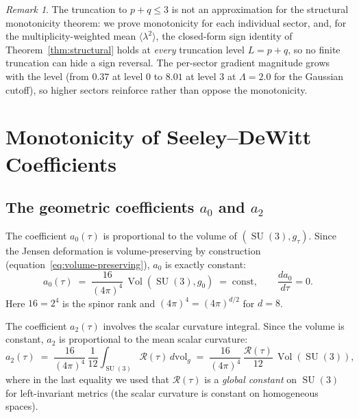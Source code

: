 \documentclass[12pt]{article}
\theoremstyle{definition}
\theoremstyle{remark}
\newtheorem{remark}[theorem]{Remark}
\DeclareMathOperator{\Vol}{Vol}
\DeclareMathOperator{\SU}{SU}
\begin{document}
\begin{remark}\label{rem:truncation}
The truncation to $p+q \leq 3$ is not an approximation for the
structural monotonicity theorem: we prove monotonicity for each
individual sector, and, for the multiplicity-weighted mean
$\langle\lambda^2\rangle$, the closed-form sign identity of
Theorem~\ref{thm:structural} holds at \emph{every} truncation level
$L = p+q$, so no finite truncation can hide a sign reversal.  The
per-sector gradient magnitude grows with the level (from $0.37$ at
level $0$ to $8.01$ at level $3$ at $\Lambda=2.0$ for the Gaussian
cutoff), so higher sectors reinforce rather than oppose the
monotonicity.
\end{remark}


\section{Monotonicity of Seeley--DeWitt Coefficients}
\label{sec:SD-mono}

\subsection{The geometric coefficients \texorpdfstring{$a_0$ and $a_2$}{a0 and a2}}

The coefficient $a_0(\tau)$ is proportional to the volume of
$(\SU(3), g_\tau)$.  Since the Jensen deformation is
volume-preserving by construction (equation~\eqref{eq:volume-preserving}),
$a_0$ is exactly constant:
\begin{equation}\label{eq:a0-constant}
  a_0(\tau) \;=\; \frac{16}{(4\pi)^4}\, \Vol(\SU(3), g_0)
  \;=\; \mathrm{const},\qquad
  \frac{da_0}{d\tau} = 0.
\end{equation}
Here $16 = 2^4$ is the spinor rank and $(4\pi)^4 = (4\pi)^{d/2}$ for
$d = 8$.

The coefficient $a_2(\tau)$ involves the scalar curvature integral.
Since the volume is constant, $a_2$ is proportional to the mean scalar
curvature:
\begin{equation}\label{eq:a2-value}
  a_2(\tau) \;=\; \frac{16}{(4\pi)^4}\,\frac{1}{12}
  \int_{\SU(3)} \mathcal{R}(\tau)\, d\mathrm{vol}_g
  \;=\; \frac{16}{(4\pi)^4}\,\frac{\mathcal{R}(\tau)}{12}\,
  \Vol(\SU(3)),
\end{equation}
where in the last equality we used that $\mathcal{R}(\tau)$ is a
\emph{global constant} on $\SU(3)$ for left-invariant metrics (the
scalar curvature is constant on homogeneous spaces).
\end{document}
